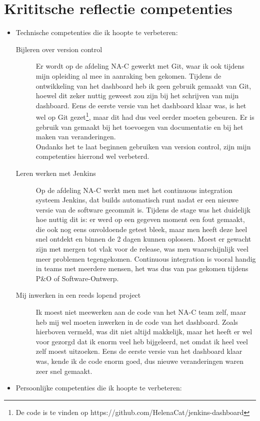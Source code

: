 \documentclass[10pt,a4paper]{article}
\begin{document}
\section{Krititsche reflectie competenties}
\label{reflectie}
\begin{itemize}
\item Technische competenties die ik hoopte te verbeteren:
\begin{description}
\item[Bijleren over version control] Er wordt op de afdeling NA-C gewerkt met Git, waar ik ook tijdens mijn opleiding al mee in aanraking ben gekomen. Tijdens de ontwikkeling van het dashboard heb ik geen gebruik gemaakt van Git, hoewel dit zeker nuttig geweest zou zijn bij het schrijven van mijn dashboard. Eens de eerste versie van het dashboard klaar was, is het wel op Git gezet\footnote{De code is te vinden op https://github.com/HelenaCat/jenkins-dashboard}, maar dit had dus veel eerder moeten gebeuren. Er is gebruik van gemaakt bij het toevoegen van documentatie en bij het maken van veranderingen.\\
Ondanks het te laat beginnen gebruiken van version control, zijn mijn competenties hierrond wel verbeterd. 
\item[Leren werken met Jenkins] Op de afdeling NA-C werkt men met het continuous integration systeem Jenkins, dat builds automatisch runt nadat er een nieuwe versie van de software gecommit is. Tijdens de stage was het duidelijk hoe nuttig dit is: er werd op een gegeven moment een fout gemaakt, die ook nog eens onvoldoende getest bleek, maar men heeft deze heel snel ontdekt en binnen de 2 dagen kunnen oplossen. Moest er gewacht zijn met mergen tot vlak voor de release, was men waarschijnlijk veel meer problemen tegengekomen. Continuous integration is vooral handig in teams met meerdere mensen, het was dus van pas gekomen tijdens P\&O of Software-Ontwerp. 
\item[Mij inwerken in een reeds lopend project] Ik moest niet meewerken aan de code van het NA-C team zelf, maar heb mij wel moeten inwerken in de code van het dashboard. Zoals hierboven vermeld, was dit niet altijd makkelijk, maar het heeft er wel voor gezorgd dat ik enorm veel heb bijgeleerd, net omdat ik heel veel zelf moest uitzoeken. Eens de eerste versie van het dashboard klaar was, kende ik de code enorm goed, dus nieuwe veranderingen waren zeer snel gemaakt.
\end{description}
\item Persoonlijke competenties die ik hoopte te verbeteren:

\end{itemize}
\end{document}
